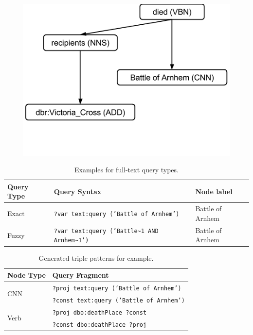 \begin{figure}[htb!]
\centering
\includegraphics[trim={0 3cm  0 0},clip,scale=0.4]{part_03/ESWC_HAWK/hawk_tree_pruned}
\label{chahawk:fig:prunedtree}
\end{figure}
\begin{table}[htb!]
\centering
\begin{tabular}{l@{\quad}l@{\quad}l}
\toprule
\textbf{Query Type} & \textbf{Query Syntax} & \textbf{Node label}\\
\midrule
Exact & \texttt{?var text:query ('Battle of Arnhem')}  & Battle of Arnhem\\
Fuzzy & \texttt{?var text:query ('Battle\textasciitilde1 AND Arnhem\textasciitilde 1')} & Battle of Arnhem\\
\bottomrule
\end{tabular}
\caption{Examples for full-text query types.}
\label{tab:exact_fuzzy}
\end{table}
\begin{table}[htb!]
\centering
\begin{tabular}{l@{\quad}l}
\toprule
\textbf{Node Type} & \textbf{Query Fragment} \\
\midrule
\multirow{2}{*}{CNN} & \texttt{?proj text:query ('Battle of Arnhem')} \\
& \texttt{?const text:query ('Battle of Arnhem')} \\
\midrule
\multirow{2}{*}{Verb} & \texttt{?proj dbo:deathPlace ?const} \\
 & \texttt{?const dbo:deathPlace ?proj} \\
\bottomrule
\end{tabular}
\caption{Generated triple patterns for  example.}
\label{tab:triple_patterns_example}
\end{table}






